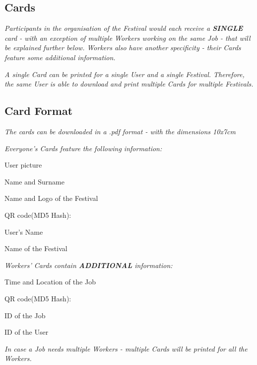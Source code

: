 		\subsection{Cards}
		\textit{Participants in the organisation of the Festival would each receive a \textbf{SINGLE} card - with an exception of multiple Workers working on the same Job - that will be explained further below. Workers also have another specificity - their Cards feature some additional information.}
		
		\textit{A single Card can be printed for a single User and a single Festival. Therefore, the same User is able to download and print multiple Cards for multiple Festivals.}
	
		\subsection{Card Format}
		\textit{The cards can be downloaded in a .pdf format - with the dimensions 10x7cm}
	
		\textit{Everyone's Cards feature the following information:}
		\begin{packed_enum}
			\item User picture
			\item Name and Surname
			\item Name and Logo of the Festival
			\item QR code(MD5 Hash):
			\item[] \begin{packed_enum}
				\item User's Name
				\item Name of the Festival
			\end{packed_enum}
		\end{packed_enum}
			
		\textit{Workers' Cards contain \textbf{ADDITIONAL} information:}
		\begin{packed_enum}
			\item Time and Location of the Job
			\item QR code(MD5 Hash):
			\item[] \begin{packed_enum}
				\item ID of the Job
				\item ID of the User
			\end{packed_enum}
		\end{packed_enum}
	
		\textit{In case a Job needs multiple Workers - multiple Cards will be printed for all the Workers.}
